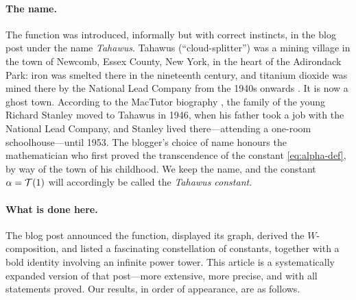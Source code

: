 \paragraph{The name.} The function was introduced, informally but with
correct instincts, in the blog post \cite{blog} under the name
\emph{Tahawus}. Tahawus (``cloud-splitter'') was a mining village in the
town of Newcomb, Essex County, New York, in the heart of the Adirondack
Park: iron was smelted there in the nineteenth century, and titanium
dioxide was mined there by the National Lead Company from the 1940s
onwards \cite{wptahawus}. It is now a ghost town. According to the
MacTutor biography \cite{mactutor}, the family of the young Richard
Stanley moved to Tahawus in 1946, when his father took a job with the
National Lead Company, and Stanley lived there---attending a one-room
schoolhouse---until 1953. The blogger's choice of name honours the
mathematician who first proved the transcendence of the constant
\eqref{eq:alpha-def}, by way of the town of his childhood. We keep the
name, and the constant $\alpha = \mathcal{T}(1)$ will accordingly be called the
\emph{Tahawus constant}.

\paragraph{What is done here.} The blog post announced the function,
displayed its graph, derived the $W$-composition, and listed a
fascinating constellation of constants, together with a bold identity
involving an infinite power tower. This article is a systematically
expanded version of that post---more extensive, more precise, and with
all statements proved. Our results, in order of appearance, are as
follows.

